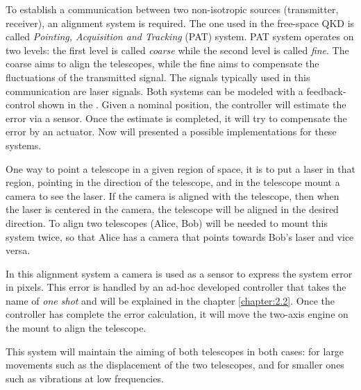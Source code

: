 To establish a communication between two non-isotropic sources (transmitter, receiver), an alignment system is required. The one used in the free-space QKD is called \textit{Pointing, Acquisition and Tracking} (PAT) system. PAT system operates on two levels: the first level is called \textit{coarse} while the second level is called \textit{fine}.
The coarse aims to align the telescopes, while the fine aims to compensate the fluctuations of the transmitted signal. The signals typically used in this communication are laser signals. Both systems can be modeled with a feedback-control shown in the .
Given a nominal position, the controller will estimate the error via a sensor. Once the estimate is completed, it will try to compensate the error by an actuator.
Now will presented a possible implementations for these systems.




One way to point a telescope in a given region of space, it is to put a laser in that region, pointing in the direction of the telescope, and in the telescope mount a camera to see the laser.
If the camera is aligned with the telescope, then when the laser is centered in the camera, the telescope will be aligned in the desired direction.
To align two telescopes (Alice, Bob) will be needed to mount this system twice, so that Alice has a camera that points towards Bob’s laser and vice versa.

In this alignment system a camera is used as a sensor to express the system error in pixels. This error is handled by an ad-hoc developed controller that takes the name of \textit{one shot} and will be explained in the chapter \ref{chapter:2.2}. Once the controller has complete the error calculation, it will move the two-axis engine on the mount to align the telescope.

This system will maintain the aiming of both telescopes in both cases: for large movements such as the displacement of the two telescopes, and for smaller ones such as vibrations at low frequencies.


